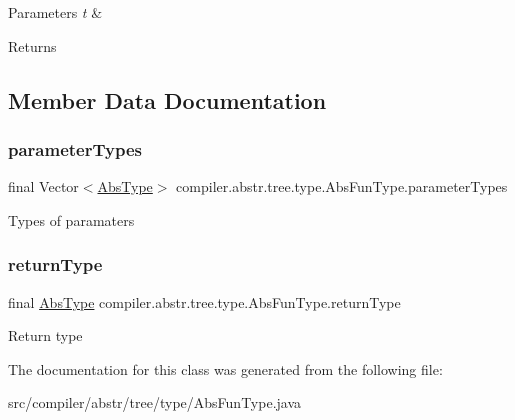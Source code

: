\begin{DoxyParams}{Parameters}
{\em t} & \\
\hline
\end{DoxyParams}
\begin{DoxyReturn}{Returns}

\end{DoxyReturn}


\subsection{Member Data Documentation}
\mbox{\label{classcompiler_1_1abstr_1_1tree_1_1type_1_1_abs_fun_type_ae8e16f0b6b3ecb7fa70462036c102bb7}} 
\subsubsection{\texorpdfstring{parameter\+Types}{parameterTypes}}
{\footnotesize\ttfamily final Vector$<$\hyperlink{classcompiler_1_1abstr_1_1tree_1_1type_1_1_abs_type}{Abs\+Type}$>$ compiler.\+abstr.\+tree.\+type.\+Abs\+Fun\+Type.\+parameter\+Types}

Types of paramaters \mbox{\label{classcompiler_1_1abstr_1_1tree_1_1type_1_1_abs_fun_type_aa73fe24d3914b149edf99b33bfe8b9f8}} 
\subsubsection{\texorpdfstring{return\+Type}{returnType}}
{\footnotesize\ttfamily final \hyperlink{classcompiler_1_1abstr_1_1tree_1_1type_1_1_abs_type}{Abs\+Type} compiler.\+abstr.\+tree.\+type.\+Abs\+Fun\+Type.\+return\+Type}

Return type 

The documentation for this class was generated from the following file\+:\begin{DoxyCompactItemize}
\item 
src/compiler/abstr/tree/type/Abs\+Fun\+Type.\+java\end{DoxyCompactItemize}
